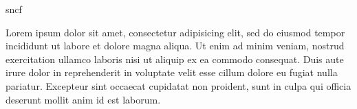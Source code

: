 \documentclass{book}
\begin{document}
\begin{pages}
\begin{Rightside}
\pend

\pstart
sncf\skipnumbering
\pend
\pstart
\begin{ledgroup}
Lorem ipsum dolor sit amet, consectetur adipisicing elit, sed do eiusmod tempor incididunt ut labore et dolore magna aliqua. Ut enim ad minim veniam, nostrud exercitation ullamco laboris nisi ut aliquip ex ea commodo consequat. Duis aute irure dolor in reprehenderit in voluptate velit esse cillum dolore eu fugiat nulla pariatur. Excepteur sint occaecat cupidatat non proident, sunt in culpa qui officia deserunt mollit anim id est laborum.
\end{ledgroup}
\pend



\endnumbering
\end{Rightside}
\Pages
\end{pages}
\end{document}
